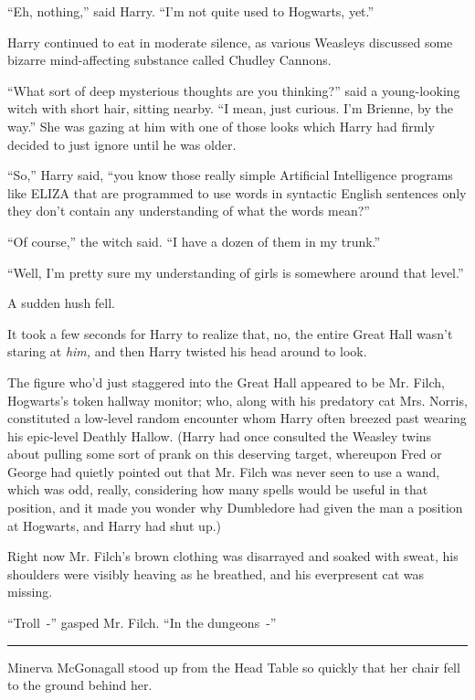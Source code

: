 ``Eh, nothing,'' said Harry. ``I'm not quite used to Hogwarts, yet.''

Harry continued to eat in moderate silence, as various Weasleys discussed some bizarre mind-affecting substance called Chudley Cannons.

``What sort of deep mysterious thoughts are you thinking?'' said a young-looking witch with short hair, sitting nearby. ``I mean, just curious. I'm Brienne, by the way.'' She was gazing at him with one of those looks which Harry had firmly decided to just ignore until he was older.

``So,'' Harry said, ``you know those really simple Artificial Intelligence programs like ELIZA that are programmed to use words in syntactic English sentences only they don't contain any understanding of what the words mean?''

``Of course,'' the witch said. ``I have a dozen of them in my trunk.''

``Well, I'm pretty sure my understanding of girls is somewhere around that level.''

A sudden hush fell.

It took a few seconds for Harry to realize that, no, the entire Great Hall wasn't staring at \emph{him,} and then Harry twisted his head around to look.

The figure who'd just staggered into the Great Hall appeared to be Mr. Filch, Hogwarts's token hallway monitor; who, along with his predatory cat Mrs. Norris, constituted a low-level random encounter whom Harry often breezed past wearing his epic-level Deathly Hallow. (Harry had once consulted the Weasley twins about pulling some sort of prank on this deserving target, whereupon Fred or George had quietly pointed out that Mr. Filch was never seen to use a wand, which was odd, really, considering how many spells would be useful in that position, and it made you wonder why Dumbledore had given the man a position at Hogwarts, and Harry had shut up.)

Right now Mr. Filch's brown clothing was disarrayed and soaked with sweat, his shoulders were visibly heaving as he breathed, and his everpresent cat was missing.

``Troll~-'' gasped Mr. Filch. ``In the dungeons~-''

\begin{center}\rule{3in}{0.4pt}\end{center}

Minerva McGonagall stood up from the Head Table so quickly that her chair fell to the ground behind her.

